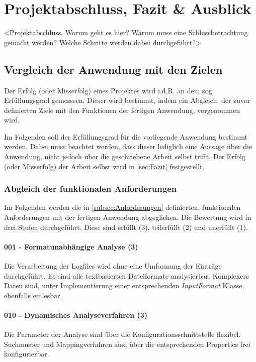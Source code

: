 
\chapter{Projektabschluss, Fazit \& Ausblick}\label{cha:Schlussbetrachtung}
<Projektabschluss. Worum geht es hier? Warum muss eine Schlussbetrachtung gemacht werden? Welche Schritte werden dabei durchgeführt?>

\section{Vergleich der Anwendung mit den Zielen}
Der Erfolg (oder Misserfolg) eines Projektes wird i.d.R. an dem sog. Erfüllungsgrad gemesssen. Dieser wird bestimmt, indem ein Abgleich, der zuvor definierten Ziele mit den Funktionen der fertigen Anwendung, vorgenommen wird.

Im Folgenden soll der Erfüllungsgrad für die vorliegende Anwendung bestimmt werden. Dabei muss beachtet werden, dass dieser lediglich eine Aussage über die Anwendung, nicht jedoch über die geschriebene Arbeit selbst trifft. Der Erfolg (oder Misserfolg) der Arbeit selbst wird in \autoref{sec:Fazit} festgestellt.

\subsection{Abgleich der funktionalen Anforderungen}
 Im Folgenden werden die in \autoref{subsec:Anforderungen} definierten, funktionalen Anforderungen mit der fertigen Anwendung abgeglichen. Die Bewertung wird in drei Stufen durchgeführt. Diese sind erfüllt (3), teilerfüllt (2) und unerfüllt (1).
 
 \subsubsection{001 - Formatunabhängige Analyse (3)}
 Die Verarbeitung der Logfiles wird ohne eine Umformung der Einträge durchgeführt. Es sind alle textbasierten Dateiformate analysierbar. Komplexere Daten sind, unter Implementierung einer entsprechenden \textit{InputFormat} Klasse, ebenfalls einlesbar.
 
 \subsubsection{010 - Dynamisches Analyseverfahren (3)}
 Die Parameter der Analyse sind über die Konfigurationsschnittstelle flexibel. Suchmuster und Mappingverfahren sind über die entsprechenden Properties frei konfigurierbar.
 
